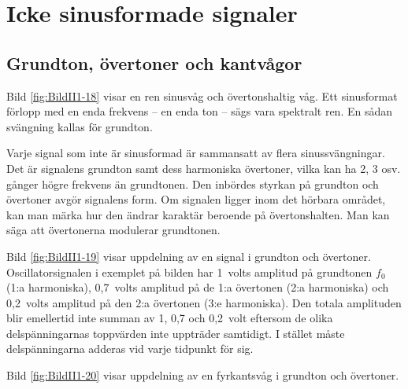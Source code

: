 
\section{Icke sinusformade signaler}

\subsection{Grundton, övertoner och kant\-vågor}
\label{övertoner}


Bild \ref{fig:BildII1-18} visar en ren sinusvåg och övertonshaltig våg.
Ett sinusformat förlopp med en enda frekvens -- en enda ton -- sägs vara
spektralt ren.
En sådan svängning kallas för grundton.

Varje signal som inte är sinusformad är sammansatt av flera sinussvängningar.
Det är signalens grundton samt dess harmoniska övertoner, vilka kan ha 2, 3
osv. gånger högre frekvens än grundtonen.
Den inbördes styrkan på grundton och övertoner avgör signalens form.
Om signalen ligger inom det hörbara området, kan man märka hur den ändrar
karaktär beroende på övertonshalten.
Man kan säga att övertonerna modulerar grundtonen.


Bild \ref{fig:BildII1-19} visar uppdelning av en signal i grundton och
övertoner.
Oscillatorsignalen i exemplet på bilden har 1~volts amplitud på grundtonen
\(f_0\) (1:a harmoniska), 0,7~volts amplitud på de 1:a övertonen
(2:a harmoniska) och 0,2~volts amplitud på den 2:a övertonen (3:e harmoniska).
Den totala amplituden blir emellertid inte summan av 1, 0,7 och 0,2~volt
eftersom de olika delspänningarnas toppvärden inte uppträder samtidigt.
I stället måste delspänningarna adderas vid varje tidpunkt för sig.


Bild \ref{fig:BildII1-20} visar uppdelning av en fyrkantsvåg i grundton och
övertoner.


